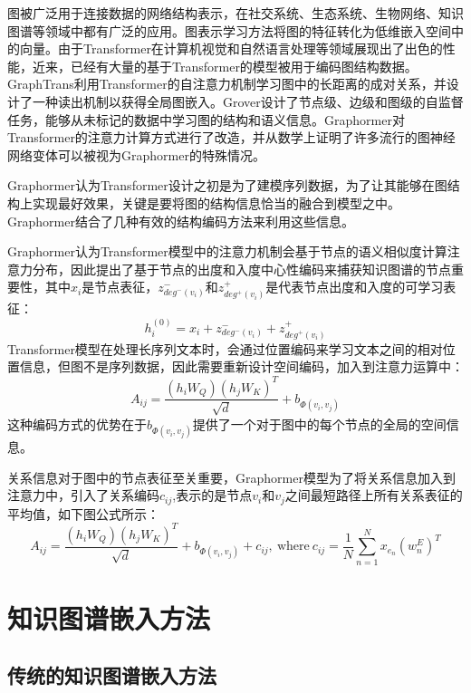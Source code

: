 图被广泛用于连接数据的网络结构表示，在社交系统、生态系统、生物网络、知识图谱等领域中都有广泛的应用。图表示学习方法将图的特征转化为低维嵌入空间中的向量。由于Transformer在计算机视觉和自然语言处理等领域展现出了出色的性能，近来，已经有大量的基于Transformer的模型被用于编码图结构数据。GraphTrans利用Transformer的自注意力机制学习图中的长距离的成对关系，并设计了一种读出机制以获得全局图嵌入。Grover设计了节点级、边级和图级的自监督任务，能够从未标记的数据中学习图的结构和语义信息。Graphormer对Transformer的注意力计算方式进行了改造，并从数学上证明了许多流行的图神经网络变体可以被视为Graphormer的特殊情况。

Graphormer认为Transformer设计之初是为了建模序列数据，为了让其能够在图结构上实现最好效果，关键是要将图的结构信息恰当的融合到模型之中。Graphormer结合了几种有效的结构编码方法来利用这些信息。

Graphormer认为Transformer模型中的注意力机制会基于节点的语义相似度计算注意力分布，因此提出了基于节点的出度和入度中心性编码来捕获知识图谱的节点重要性，其中$x_i$是节点表征，$z^-_{deg^-(v_i)}$和$z^+_{deg^+(v_i)}$是代表节点出度和入度的可学习表征：
\begin{equation}
  h_i^{(0)}=x_i+z^-_{deg^-(v_i)}+z^+_{deg^+(v_i)}
\end{equation}
Transformer模型在处理长序列文本时，会通过位置编码来学习文本之间的相对位置信息，但图不是序列数据，因此需要重新设计空间编码，加入到注意力运算中：
\begin{equation}
  A_{ij}=\frac{(h_iW_Q)(h_jW_K)^T}{\sqrt{d}}+b_{\varPhi (v_i,v_j)}
\end{equation}
这种编码方式的优势在于$b_{\varPhi (v_i,v_j)}$提供了一个对于图中的每个节点的全局的空间信息。

关系信息对于图中的节点表征至关重要，Graphormer模型为了将关系信息加入到注意力中，引入了关系编码$c_{ij}$,表示的是节点$v_i$和$v_j$之间最短路径上所有关系表征的平均值，如下图公式所示：
\begin{equation}
  A_{ij}=\frac{(h_iW_Q)(h_jW_K)^T}{\sqrt{d}}+b_{\varPhi (v_i,v_j)}+c_{ij},\ \mbox{where} \ c_{ij} = \frac{1}{N}\sum_{n=1}^Nx_{e_n}(w_n^E)^T
\end{equation}
\section{知识图谱嵌入方法}

\subsection{传统的知识图谱嵌入方法}


